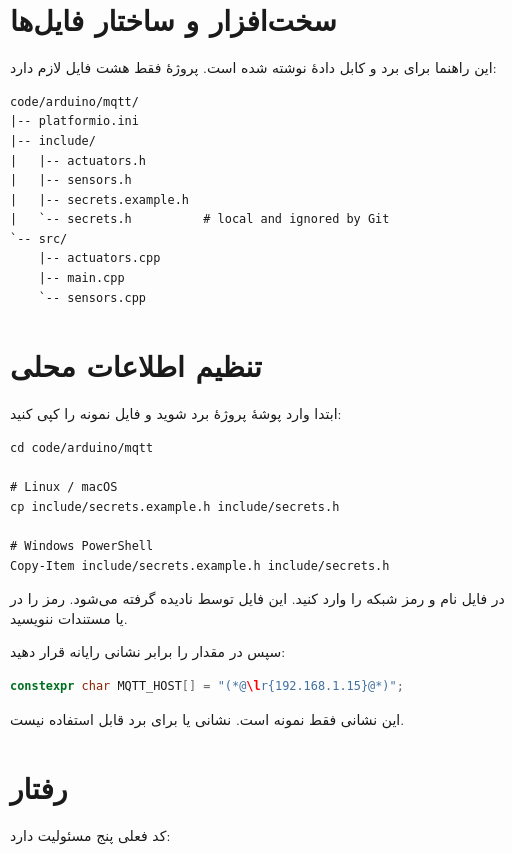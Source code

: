 \section{سخت‌افزار و ساختار فایل‌ها}
این راهنما برای برد
و کابل دادهٔ
نوشته شده است. پروژهٔ
فقط هشت فایل لازم دارد:

\begin{LTR}
\begin{lstlisting}
code/arduino/mqtt/
|-- platformio.ini
|-- include/
|   |-- actuators.h
|   |-- sensors.h
|   |-- secrets.example.h
|   `-- secrets.h          # local and ignored by Git
`-- src/
    |-- actuators.cpp
    |-- main.cpp
    `-- sensors.cpp
\end{lstlisting}
\end{LTR}

\section{تنظیم اطلاعات محلی}
ابتدا وارد پوشهٔ پروژهٔ برد شوید و فایل نمونه را کپی کنید:

\begin{LTR}
\begin{lstlisting}
cd code/arduino/mqtt

# Linux / macOS
cp include/secrets.example.h include/secrets.h

# Windows PowerShell
Copy-Item include/secrets.example.h include/secrets.h
\end{lstlisting}
\end{LTR}

در فایل
نام و رمز شبکه را وارد کنید. این فایل توسط
نادیده گرفته می‌شود. رمز را در
یا مستندات ننویسید.

سپس در
مقدار
را برابر نشانی رایانه قرار دهید:

\begin{LTR}
\begin{lstlisting}[language=C++]
constexpr char MQTT_HOST[] = "(*@\lr{192.168.1.15}@*)";
\end{lstlisting}
\end{LTR}

این نشانی فقط نمونه است. نشانی
یا
برای برد قابل استفاده نیست.

\section{رفتار
}
کد فعلی پنج مسئولیت دارد:

